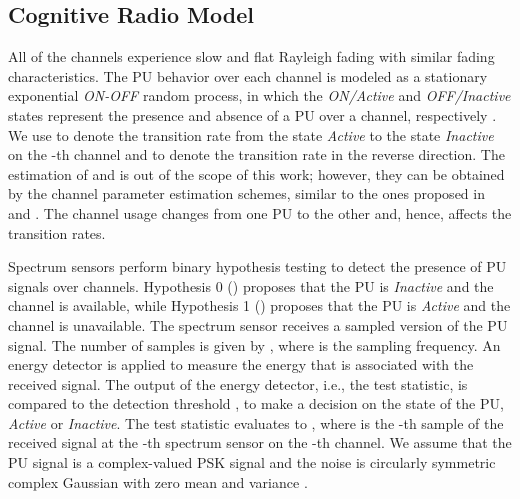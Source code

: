 \documentclass[journal]{IEEEtran} \ifCLASSINFOpdf
\begin{document}
\subsection{Cognitive Radio Model}
\label{subsec_cr}
All of the channels experience slow and flat Rayleigh fading with similar fading characteristics. The PU behavior over each channel is modeled as a stationary exponential \textit{ON-OFF} random process, in which the \textit{ON/Active} and \textit{OFF/Inactive} states represent the presence and absence of a PU over a channel, respectively . We use  to denote the transition rate from the state \textit{Active} to the state \textit{Inactive} on the -th channel and  to denote the transition rate in the reverse direction. The estimation of   and  is out of the scope of this work; however, they can be obtained by the channel parameter estimation schemes, similar to the ones proposed in \cite{Tehrani2012} and \cite{Kim2008}.  The channel usage changes from one PU to the other and, hence, affects the transition rates.



Spectrum sensors perform binary hypothesis testing to detect the presence of PU signals over channels. Hypothesis 0 () proposes that the PU is \textit{Inactive} and the channel is available, while Hypothesis 1 () proposes that the PU is \textit{Active} and the channel is unavailable. The spectrum sensor receives a sampled version of the PU signal. The number of samples is given by , where  is the sampling frequency. An energy detector is applied to measure the energy that is associated with the received signal. The output of the energy detector, i.e., the test statistic, is compared to the detection threshold , to make a decision on the state of the PU, \textit{Active} or \textit{Inactive}. The test statistic evaluates to , where  is the -th sample of the received signal at the -th spectrum sensor on the -th channel. We assume that the PU signal is a complex-valued PSK signal and the noise is circularly symmetric complex Gaussian with zero mean and  variance \cite{Liang2008}.
\end{document}
